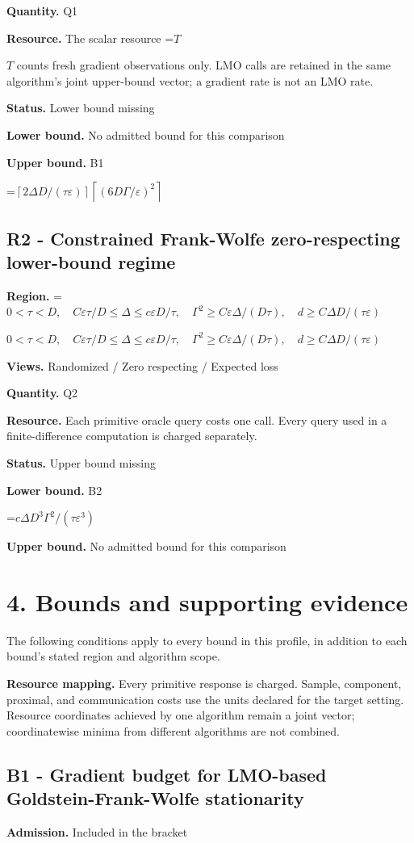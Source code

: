 \documentclass[10pt,a4paper]{article}
\newcommand{\AtlasMath}[1]{\par\begingroup\centering\setbox0=\hbox{$\displaystyle #1$}\ifdim\wd0>1.4\linewidth\typeout{ATLAS WIDE FORMULA: \the\wd0}\fi\ifdim\wd0>\linewidth\resizebox{\linewidth}{!}{\box0}\else\box0\fi\par\endgroup}
\newcommand{\AtlasInlineMath}[1]{\begingroup\setbox0=\hbox{$#1$}\ifdim\wd0>.4\linewidth\endgroup\AtlasMath{#1}\else\endgroup$#1$\fi}
\begin{document}
\textbf{Quantity.} Q1

\textbf{Resource.} The scalar resource \AtlasInlineMath{T} counts fresh gradient observations only. LMO calls are retained in the same algorithm's joint upper-bound vector; a gradient rate is not an LMO rate.

\textbf{Status.} Lower bound missing

\textbf{Lower bound.} No admitted bound for this comparison

\textbf{Upper bound.} B1

\AtlasMath{\left\lceil2\Delta D/(\tau\varepsilon)\right\rceil\left\lceil(6D\Gamma/\varepsilon)^2\right\rceil}
\subsection{R2 - Constrained Frank-Wolfe zero-respecting lower-bound regime}
\textbf{Region.} \AtlasInlineMath{0<\tau<D,\quad C\varepsilon\tau/D\le\Delta\le c\varepsilon D/\tau,\quad\Gamma^2\ge C\varepsilon\Delta/(D\tau),\quad d\ge C\Delta D/(\tau\varepsilon)}

\textbf{Views.} Randomized / Zero respecting / Expected loss

\textbf{Quantity.} Q2

\textbf{Resource.} Each primitive oracle query costs one call. Every query used in a finite-difference computation is charged separately.

\textbf{Status.} Upper bound missing

\textbf{Lower bound.} B2

\AtlasMath{c\Delta D^3\Gamma^2/(\tau\varepsilon^3)}
\textbf{Upper bound.} No admitted bound for this comparison

\section{4. Bounds and supporting evidence}
The following conditions apply to every bound in this profile, in addition to each bound's stated region and algorithm scope.

\textbf{Resource mapping.} Every primitive response is charged. Sample, component, proximal, and communication costs use the units declared for the target setting. Resource coordinates achieved by one algorithm remain a joint vector; coordinatewise minima from different algorithms are not combined.

\subsection{B1 - Gradient budget for LMO-based Goldstein-Frank-Wolfe stationarity}
\textbf{Admission.} Included in the bracket
\end{document}
